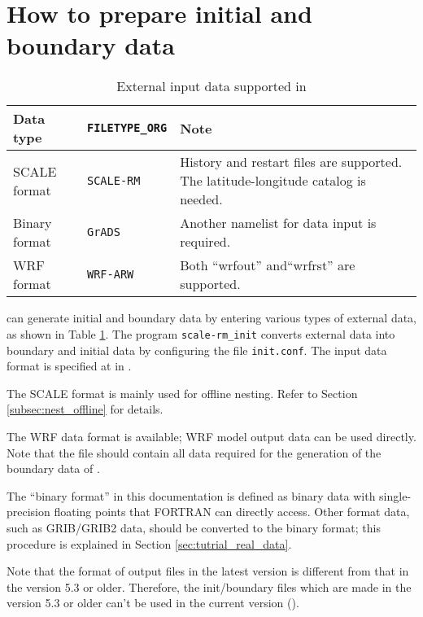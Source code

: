 \section{How to prepare initial and boundary data} \label{sec:adv_datainput}

\begin{table}[tbh]
\begin{center}
\caption{External input data supported in \scalelib}
\begin{tabularx}{150mm}{l|l|X} \hline
 \rowcolor[gray]{0.9} Data type   & \verb|FILETYPE_ORG|  & Note \\ \hline
 SCALE format   & \verb|SCALE-RM|     & History and restart files are supported. The latitude-longitude catalog is needed. \\ \hline
 Binary format  & \verb|GrADS|        & Another namelist for data input is required.    \\ \hline
 WRF format     & \verb|WRF-ARW|      & Both ``wrfout''  and``wrfrst'' are supported.\\ \hline
\end{tabularx}
\label{tab:inputdata_format}
\end{center}
\end{table}

\scalerm can generate initial and boundary data by entering various types of external data, as shown in Table \ref{tab:inputdata_format}.
The program \verb|scale-rm_init| converts external data into boundary and initial data by configuring the file \verb|init.conf|.
The input data format is specified at  in .

The SCALE format is mainly used for offline nesting.
Refer to Section \ref{subsec:nest_offline} for details.

The WRF data format is available; WRF model output data can be used directly.
Note that the file should contain all data required for the generation of the boundary data of \scalerm.

The ``binary format'' in this documentation is defined as binary data with single-precision floating points that FORTRAN can directly access.
Other format data, such as GRIB/GRIB2 data, should be converted to the binary format; this procedure is explained in Section \ref{sec:tutrial_real_data}.

Note that the format of output files in the latest version is different from that in the version 5.3 or older.
Therefore, the init/boundary files which are made in the version 5.3 or older can't be used in the current version (\scalelib \version).

